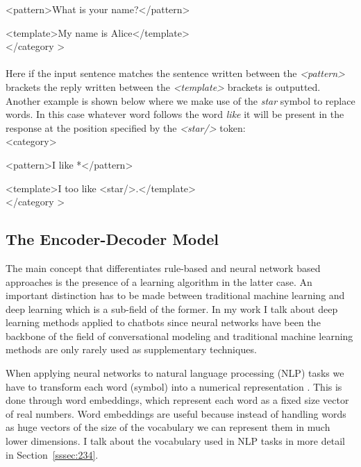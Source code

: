 \documentclass[12pt]{article}
\begin{document}
{\color{OliveGreen}\textless pattern\textgreater}What is your name?{\color{OliveGreen}\textless/pattern\textgreater}

{\color{OliveGreen}\textless template\textgreater}My name is Alice{\color{OliveGreen}\textless/template\textgreater}\\
{\color{OliveGreen}\textless/category \textgreater}\\
\\
Here if the input sentence matches the sentence written between the \textit{\textless pattern\textgreater} brackets the reply written between the \textit{\textless template\textgreater} brackets is outputted.\\
Another example is shown below where we make use of the \textit{star} symbol to replace words. In this case whatever word follows the word \textit{like} it will be present in the response at the position specified by the \textit{\textless star/\textgreater} token:\\
{\color{OliveGreen}\textless category\textgreater}

{\color{OliveGreen}\textless pattern\textgreater}I like *{\color{OliveGreen}\textless/pattern\textgreater}

{\color{OliveGreen}\textless template\textgreater}I too like {\color{OliveGreen}\textless star/\textgreater}.{\color{OliveGreen}\textless/template\textgreater}\\
{\color{OliveGreen}\textless/category \textgreater}\\

\subsection{The Encoder-Decoder Model} \label{ssec:23}
The main concept that differentiates rule-based and neural network based approaches is the presence of a learning algorithm in the latter case. An important distinction has to be made between traditional machine learning and deep learning which is a sub-field of the former. In my work I talk about deep learning methods applied to chatbots since neural networks have been the backbone of the field of conversational modeling and traditional machine learning methods are only rarely used as supplementary techniques.   

When applying neural networks to natural language processing (NLP) tasks we have to transform each word (symbol) into a numerical representation \cite{Bengio:2003}. This is done through word embeddings, which represent each word as a fixed size vector of real numbers. Word embeddings are useful because instead of handling words as huge vectors of the size of the vocabulary we can represent them in much lower dimensions. I talk about the vocabulary used in NLP tasks in more detail in Section~\ref{sssec:234}.
\end{document}

